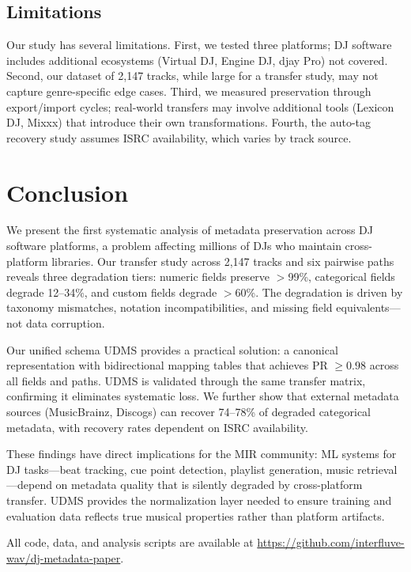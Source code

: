 \subsection{Limitations}

Our study has several limitations. First, we tested three platforms; DJ software includes additional ecosystems (Virtual DJ, Engine DJ, djay Pro) not covered. Second, our dataset of 2,147 tracks, while large for a transfer study, may not capture genre-specific edge cases. Third, we measured preservation through export/import cycles; real-world transfers may involve additional tools (Lexicon DJ, Mixxx) that introduce their own transformations. Fourth, the auto-tag recovery study assumes ISRC availability, which varies by track source.



\section{Conclusion}

We present the first systematic analysis of metadata preservation across DJ software platforms, a problem affecting millions of DJs who maintain cross-platform libraries. Our transfer study across 2,147 tracks and six pairwise paths reveals three degradation tiers: numeric fields preserve $>$99\%, categorical fields degrade 12--34\%, and custom fields degrade $>$60\%. The degradation is driven by taxonomy mismatches, notation incompatibilities, and missing field equivalents---not data corruption.

Our unified schema UDMS provides a practical solution: a canonical representation with bidirectional mapping tables that achieves PR $\geq 0.98$ across all fields and paths. UDMS is validated through the same transfer matrix, confirming it eliminates systematic loss. We further show that external metadata sources (MusicBrainz, Discogs) can recover 74--78\% of degraded categorical metadata, with recovery rates dependent on ISRC availability.

These findings have direct implications for the MIR community: ML systems for DJ tasks---beat tracking, cue point detection, playlist generation, music retrieval---depend on metadata quality that is silently degraded by cross-platform transfer. UDMS provides the normalization layer needed to ensure training and evaluation data reflects true musical properties rather than platform artifacts.

All code, data, and analysis scripts are available at \url{https://github.com/interfluve-wav/dj-metadata-paper}.
